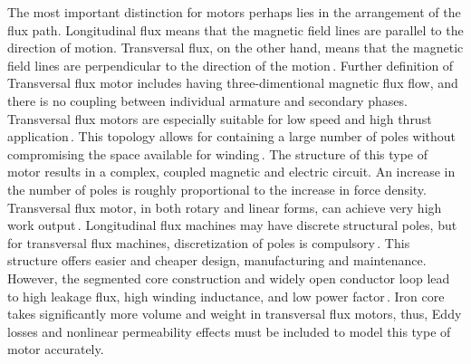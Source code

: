         
        The most important distinction for motors perhaps lies in the arrangement of the flux path. Longitudinal flux means that the magnetic field lines are parallel to the direction of motion. Transversal flux, on the other hand, means that the magnetic field lines are perpendicular to the direction of the motion\,\cite{Laithwaite1975LinearView}. Further definition of Transversal flux motor includes having three-dimentional magnetic flux flow, and there is no coupling between individual armature and secondary phases. Transversal flux motors are especially suitable for low speed and high thrust application\,\cite{Zhao2015,Shin2015}. This topology allows for containing a large number of poles without compromising the space available for winding\,\cite{Laithwaite1971}. The structure of this type of motor results in a complex, coupled magnetic and electric circuit. An increase in the number of poles is roughly proportional to the increase in force density. Transversal flux motor, in both rotary and linear forms, can achieve very high work output\,\cite{Ueda2014SmallCondition,Hsu2011DevelopmentMotor,Wang2016OptimalApplications,Arshad2001,Siatkowski2008}. Longitudinal flux machines may have discrete structural poles, but for transversal flux machines, discretization of poles is compulsory\,\cite{Baoming2009DesignMotor}. This structure offers easier and cheaper design, manufacturing and maintenance. However, the segmented core construction and widely open conductor loop lead to high leakage flux, high winding inductance, and low power factor\,\cite{Harris1997ComparisonMachines,Lu2003ModelingMachine}.  Iron core takes significantly more volume and weight in transversal flux motors, thus, Eddy losses and nonlinear permeability effects must be included to model this type of motor accurately.
        
